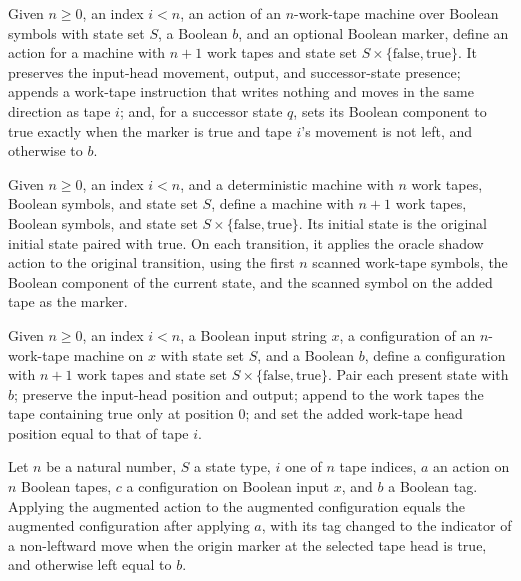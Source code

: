 \begin{definition}
\label{Turing.oracleShadowAction}
\leanok
{}
Given $n\geq 0$, an index $i<n$, an action of an $n$-work-tape machine over Boolean
symbols with state set $S$, a Boolean $b$, and an optional Boolean marker, define an
action for a machine with $n+1$ work tapes and state set
$S\times\{\mathrm{false},\mathrm{true}\}$. It preserves the input-head movement, output,
and successor-state presence; appends a work-tape instruction that writes nothing and
moves in the same direction as tape $i$; and, for a successor state $q$, sets its
Boolean component to true exactly when the marker is true and tape $i$'s movement is not
left, and otherwise to $b$.
\end{definition}

\begin{definition}
\label{Turing.oracleShadowTM}
\leanok
{}
Given $n\geq 0$, an index $i<n$, and a deterministic machine with $n$ work tapes,
Boolean symbols, and state set $S$, define a machine with $n+1$ work tapes, Boolean
symbols, and state set $S\times\{\mathrm{false},\mathrm{true}\}$. Its initial state is
the original initial state paired with true. On each transition, it applies the oracle
shadow action to the original transition, using the first $n$ scanned work-tape symbols,
the Boolean component of the current state, and the scanned symbol on the added tape as
the marker.
\end{definition}

\begin{definition}
\label{Turing.oracleShadowCfg}
\leanok
{}
Given $n\geq 0$, an index $i<n$, a Boolean input string $x$, a configuration of an
$n$-work-tape machine on $x$ with state set $S$, and a Boolean $b$, define a
configuration with $n+1$ work tapes and state set
$S\times\{\mathrm{false},\mathrm{true}\}$. Pair each present state with $b$; preserve
the input-head position and output; append to the work tapes the tape containing true
only at position $0$; and set the added work-tape head position equal to that of tape
$i$.
\end{definition}

\begin{theorem}
\label{Turing.oracleShadowAction_apply}
\leanok
{}
Let $n$ be a natural number, $S$ a state type, $i$ one of $n$ tape indices, $a$ an
action on $n$ Boolean tapes, $c$ a configuration on Boolean input $x$, and $b$ a Boolean
tag. Applying the augmented action to the augmented configuration equals the augmented
configuration after applying $a$, with its tag changed to the indicator of a
non-leftward move when the origin marker at the selected tape head is true, and
otherwise left equal to $b$.
\end{theorem}

